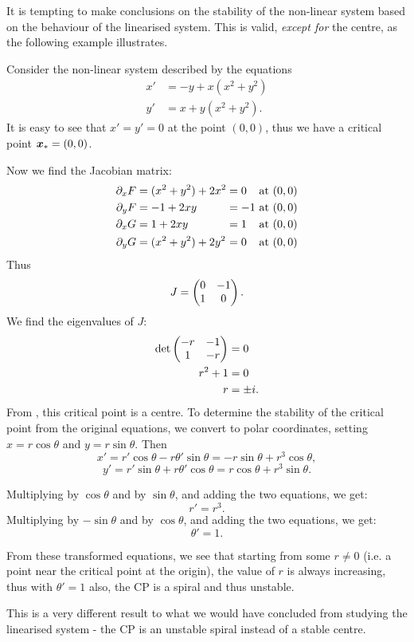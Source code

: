 It is tempting to make conclusions on the stability of the non-linear system based on the behaviour of the linearised system. This is valid, \emph{except for} the centre, as the following example illustrates.

\begin{eg}\label{eg:centrecp}
	Consider the non-linear system described by the equations
	\begin{align*}
		x' &= -y + x(x^2+y^2) \\
		y' &= x + y(x^2+y^2).
	\end{align*}
	It is easy to see that $x'=y'=0$ at the point $(0,0)$, thus we have a critical point $\bm{x}_{\ast} = (0,0)$.
	
	Now we find the Jacobian matrix:
	\begin{equation*}
		\begin{alignedat}{3}
			\partial_x F &= (x^2+y^2) + 2x^2 &&= 0 &\text{ at } (0,0) \\
			\partial_y F &= -1 + 2xy &&= -1 &\text{ at } (0,0) \\
			\partial_x G &= 1 + 2xy &&= 1 &\text{ at } (0,0) \\
			\partial_y G &= (x^2+y^2) + 2y^2 &&= 0 &\text{ at } (0,0) \\
		\end{alignedat}
	\end{equation*}
	Thus
	\[
	J = \begin{pmatrix}0 & -1 \\ 1 & 0\end{pmatrix}.
	\]
	We find the eigenvalues of $J$:
	\begin{align*}
		\det \begin{pmatrix}-r & -1 \\ 1 & -r\end{pmatrix} &= 0 \\
		r^2 + 1 &= 0 \\
		r &= \pm i.
	\end{align*}
	From , this critical point is a centre. To determine the stability of the critical point from the original equations, we convert to polar coordinates, setting $x=r\cos\theta$ and $y=r\sin\theta$. Then
	\begin{equation}\label{eq:polareg1}
		x' = r'\cos{\theta} - r\theta'\sin{\theta} = -r\sin\theta + r^3\cos\theta,
	\end{equation}
	\begin{equation}\label{eq:polareg2}
		y' = r'\sin{\theta} + r\theta'\cos{\theta} = r\cos\theta + r^3\sin\theta.
	\end{equation}
	
	Multiplying  by $\cos{\theta}$ and  by $\sin{\theta}$, and adding the two equations, we get: 
	\[
	r' = r^3.
	\]
	Multiplying  by $-\sin{\theta}$ and  by $\cos{\theta}$, and adding the two equations, we get: 
	\[
	\theta' = 1.
	\]
	
	From these transformed equations, we see that starting from some $r\neq 0$ (i.e. a point near the critical point at the origin), the value of $r$ is always increasing, thus with $\theta'=1$ also, the CP is a spiral and thus unstable.
	
	This is a very different result to what we would have concluded from studying the linearised system - the CP is an unstable spiral instead of a stable centre.
\end{eg}


